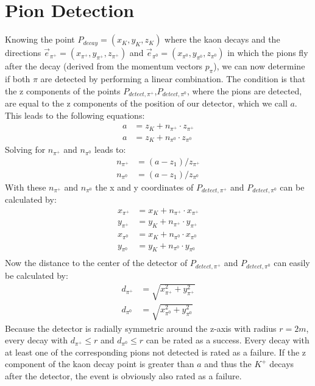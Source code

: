 \documentclass[a4paper,parskip,11pt, DIV12]{scrreprt}
\begin{document}
\clearpage


\section{Pion Detection} \label{sec:pdetection}

Knowing the point $P_{decay}=(x_K,y_K,z_K)$  where the kaon decays and the directions $\vec{e}_{\pi^+}=(x_{\pi^+},y_{\pi^+},z_{\pi^+})$ and $\vec{e}_{\pi^0}=(x_{\pi^0},y_{\pi^0},z_{\pi^0})$ in which the pions fly after the decay (derived from the momentum vectors $p_{\pi}$), we can now determine if both $\pi$ are detected by performing a linear combination. The condition is that the z components of the points $P_{detect,\pi^+}$,$P_{detect,\pi^0}$, where the pions are detected, are equal to the z components of the position of our detector, which we call $a$. This leads to the following equations:
\begin{align*}
a &= z_K + n_{\pi^+} \cdot z_{\pi^+} \\ 
a &= z_K + n_{\pi^0} \cdot z_{\pi^0}
\end{align*} 
Solving for $n_{\pi^+}$ and  $n_{\pi^0}$ leads to: 
\begin{align*}
n_{\pi^+} &= (a-z_1)/z_{\pi^+}\\
n_{\pi^0} &= (a-z_1)/z_{\pi^0}
\end{align*}
With these $n_{\pi^+}$ and $n_{\pi^0}$ the x and y coordinates of $P_{detect,\pi^+}$ and $P_{detect,\pi^0}$ can be calculated by:
\begin{align*}
x_{\pi^+} &= x_K+n_{\pi^+} \cdot x_{\pi^+}\\
y_{\pi^+} &= y_K+n_{\pi^+} \cdot y_{\pi^+}\\
x_{\pi^0} &= x_K+n_{\pi^0} \cdot x_{\pi^0}\\
y_{\pi^0} &= y_K+n_{\pi^0} \cdot y_{\pi^0}\\
\end{align*}
Now the distance to the center of the detector of $P_{detect,\pi^+}$ and $P_{detect,\pi^0}$ can easily be calculated by:
\begin{align*}
d_{\pi^+} &= \sqrt{x_{\pi^+}^2 + y_{\pi^+}^2}\\
d_{\pi^0} &= \sqrt{x_{\pi^0}^2 +  y_{\pi^0}^2} 
\end{align*}
Because the detector is radially symmetric around the z-axis with radius $r=2m$, every decay with $d_{\pi^+} \leq r$ and $d_{\pi^0} \leq r$ can be rated as a success. Every decay with at least one of the corresponding pions not detected is rated as a failure. 
If the z component of the kaon decay point is greater than $a$ and thus the $K^+$ decays after the detector, the event is obviously also rated as a failure. 
\end{document}
